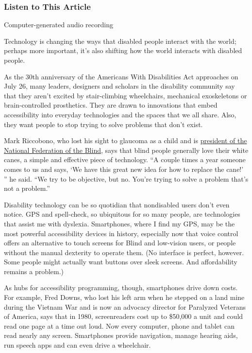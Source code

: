 \hypertarget{listen-to-this-article}{%
\subsubsection{Listen to This Article}\label{listen-to-this-article}}

Computer-generated audio recording

Technology is changing the ways that disabled people interact with the
world; perhaps more important, it's also shifting how the world
interacts with disabled people.

As the 30th anniversary of the Americans With Disabilities Act
approaches on July 26, many leaders, designers and scholars in the
disability community say that they aren't excited by stair-climbing
wheelchairs, mechanical exoskeletons or brain-controlled prosthetics.
They are drawn to innovations that embed accessibility into everyday
technologies and the spaces that we all share. Also, they want people to
stop trying to solve problems that don't exist.

Mark Riccobono, who lost his sight to glaucoma as a child and is
\href{https://www.nfb.org/about-us/leadership/presidents-corner/mark-riccobono}{president
of the National Federation of the Blind}, says that blind people
generally love their white canes, a simple and effective piece of
technology. ``A couple times a year someone comes to us and says, `We
have this great new idea for how to replace the cane!' '' he said. ``We
try to be objective, but no. You're trying to solve a problem that's not
a problem.''

Disability technology can be so quotidian that nondisabled users don't
even notice. GPS and spell-check, so ubiquitous for so many people, are
technologies that assist me with dyslexia. Smartphones, where I find my
GPS, may be the most powerful accessibility devices in history,
especially now that voice control offers an alternative to touch screens
for Blind and low-vision users, or people without the manual dexterity
to operate them. (No interface is perfect, however. Some people might
actually want buttons over sleek screens. And affordability remains a
problem.)

As hubs for accessibility programming, though, smartphones drive down
costs. For example, Fred Downs, who lost his left arm when he stepped on
a land mine during the Vietnam War and is now an advocacy director for
Paralyzed Veterans of America, says that in 1980, screenreaders cost up
to \$50,000 a unit and could read one page at a time out loud. Now every
computer, phone and tablet can read nearly any screen. Smartphones
provide navigation, manage hearing aids, run speech apps and can even
drive a wheelchair.

